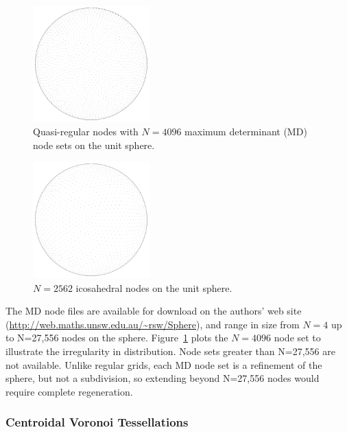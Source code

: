 \documentclass[11pt]{report}
\begin{document}
{\begin{figure} 
\centering
\includegraphics[width=0.4\textwidth]{rbffd_methods_content/grids/N4096_points.pdf} 
\caption{Quasi-regular nodes with $N=4096$ maximum determinant (MD) node sets on the unit sphere.} 
\label{fig:md_nodes}
\end{figure}
\begin{figure} 
\centering
\includegraphics[width=0.4\textwidth]{rbffd_methods_content/grids/ICOS2562.pdf} 
\caption{$N=2562$ icosahedral nodes on the unit sphere.} 
\label{fig:icos_nodes}
\end{figure}

The MD node files are available for download on the authors' web site (\url{http://web.maths.unsw.edu.au/~rsw/Sphere}), and range in size from $N=4$ up to N=27,556 nodes on the sphere. Figure~\ref{fig:md_nodes} plots the $N=4096$ node set to illustrate the irregularity in distribution. Node sets greater than N=27,556 are not available. Unlike regular grids, each MD node set is a refinement of the sphere, but not a subdivision, so extending beyond N=27,556 nodes would require complete regeneration.



\subsubsection{Centroidal Voronoi Tessellations}

}
\end{document}
